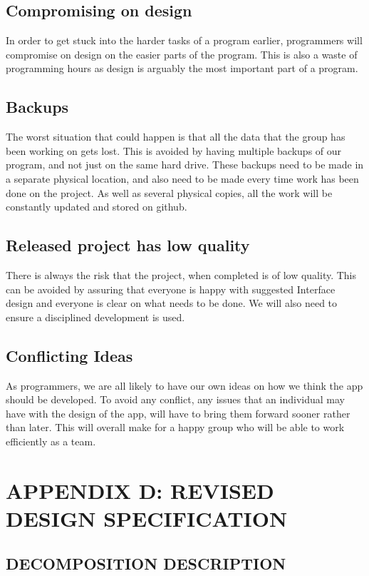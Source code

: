 \documentclass{project}
\begin{document}
\subsection{Compromising on design}
In order to get stuck into the harder tasks of a program earlier, programmers will compromise on design on the easier parts of the program. This is also a waste of programming hours as design is arguably the most important part of a program.
 
\subsection{Backups}
The worst situation that could happen is that all the data that the group has been working on gets lost. This is avoided by having multiple backups of our program,
and not just on the same hard drive. These backups need to be made in a separate physical location, and also need to be made every time work has been done on the project. As well as several physical copies, all the work will be constantly updated and stored on github.

\subsection{Released project has low quality}
There is always the risk that the project, when completed is of low quality. 
This can be avoided by assuring that everyone is happy with suggested Interface design and everyone is clear on what needs to be done. 
We will also need to ensure a disciplined development is used.

\subsection{Conflicting Ideas}
As programmers, we are all likely to have our own ideas on how we think the app should be developed. 
To avoid any conflict, any issues that an individual may have with the design of the app, 
will have to bring them forward sooner rather than later. This will overall make for a happy group who will be able to work efficiently as a team.



\newpage

\section{APPENDIX D: REVISED DESIGN SPECIFICATION}


\subsection{DECOMPOSITION DESCRIPTION}
\end{document}

